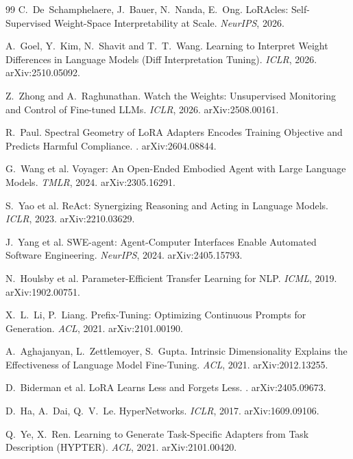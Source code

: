 \documentclass[11pt]{article}
\begin{document}
\begin{thebibliography}{99}
 C.~De~Schamphelaere, J.~Bauer, N.~Nanda, E.~Ong.
\newblock LoRAcles: Self-Supervised Weight-Space Interpretability at Scale.
\newblock \emph{NeurIPS}, 2026.

 A.~Goel, Y.~Kim, N.~Shavit and T.~T.~Wang.
\newblock Learning to Interpret Weight Differences in Language Models (Diff Interpretation Tuning).
\newblock \emph{ICLR}, 2026. arXiv:2510.05092.

 Z.~Zhong and A.~Raghunathan.
\newblock Watch the Weights: Unsupervised Monitoring and Control of Fine-tuned LLMs.
\newblock \emph{ICLR}, 2026. arXiv:2508.00161.

 R.~Paul.
\newblock Spectral Geometry of LoRA Adapters Encodes Training Objective and Predicts Harmful Compliance.
. arXiv:2604.08844.

 G.~Wang et al.
\newblock Voyager: An Open-Ended Embodied Agent with Large Language Models.
\newblock \emph{TMLR}, 2024. arXiv:2305.16291.

 S.~Yao et al.
\newblock ReAct: Synergizing Reasoning and Acting in Language Models.
\newblock \emph{ICLR}, 2023. arXiv:2210.03629.

 J.~Yang et al.
\newblock SWE-agent: Agent-Computer Interfaces Enable Automated Software Engineering.
\newblock \emph{NeurIPS}, 2024. arXiv:2405.15793.

 N.~Houlsby et al.
\newblock Parameter-Efficient Transfer Learning for NLP.
\newblock \emph{ICML}, 2019. arXiv:1902.00751.

 X.~L.~Li, P.~Liang.
\newblock Prefix-Tuning: Optimizing Continuous Prompts for Generation.
\newblock \emph{ACL}, 2021. arXiv:2101.00190.

 A.~Aghajanyan, L.~Zettlemoyer, S.~Gupta.
\newblock Intrinsic Dimensionality Explains the Effectiveness of Language Model Fine-Tuning.
\newblock \emph{ACL}, 2021. arXiv:2012.13255.

 D.~Biderman et al.
\newblock LoRA Learns Less and Forgets Less.
. arXiv:2405.09673.

 D.~Ha, A.~Dai, Q.~V.~Le.
\newblock HyperNetworks.
\newblock \emph{ICLR}, 2017. arXiv:1609.09106.

 Q.~Ye, X.~Ren.
\newblock Learning to Generate Task-Specific Adapters from Task Description (HYPTER).
\newblock \emph{ACL}, 2021. arXiv:2101.00420.


\end{thebibliography}
\end{document}
